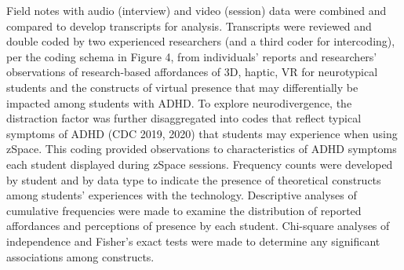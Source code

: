 \documentclass[11.5pt]{sig-alternate} %
\begin{document}
\begin{large}
Field notes with audio (interview) and video (session) data were combined and compared to develop transcripts for analysis. Transcripts were reviewed and double coded by two experienced researchers (and a third coder for intercoding), per the coding schema in Figure 4, from individuals’ reports and researchers’ observations of research-based affordances of 3D, haptic, VR for neurotypical students and the constructs of virtual presence that may differentially be impacted among students with ADHD. To explore neurodivergence, the distraction factor was further disaggregated into codes that reflect typical symptoms of ADHD (CDC 2019, 2020) that students may experience when using zSpace. This coding provided observations to characteristics of ADHD symptoms each student displayed during zSpace sessions. Frequency counts were developed by student and by data type to indicate the presence of theoretical constructs among students’ experiences with the technology. Descriptive analyses of cumulative frequencies were made to examine the distribution of reported affordances and perceptions of presence by each student. Chi-square analyses of independence and Fisher’s exact tests were made to determine any significant associations among constructs.


\end{large}
\end{document}
